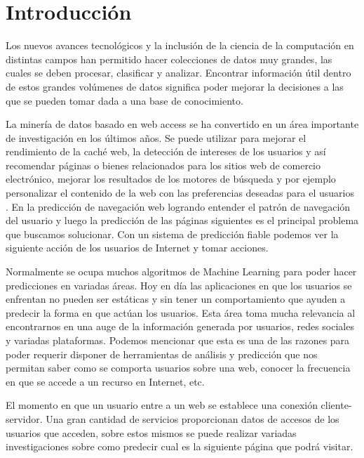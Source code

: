 \chapter[Introducción]{Introducción}
\label{ch:intro}

{

Los nuevos avances tecnológicos  y la inclusión de la ciencia de la computación en distintas campos han permitido hacer colecciones de datos muy grandes, las cuales se deben procesar, clasificar y analizar. Encontrar información útil dentro de estos grandes volúmenes de datos significa poder mejorar la decisiones a las que se pueden tomar dada a una base de conocimiento.

La minería de datos basado en web access se ha convertido en un área importante de investigación en los últimos años. Se puede utilizar para mejorar el rendimiento de la caché web, la detección de intereses de los usuarios y así recomendar páginas o bienes relacionados para los sitios web de comercio electrónico, mejorar los resultados de los motores de búsqueda  y por ejemplo personalizar el contenido de la web con las preferencias deseadas para el usuarios . En la predicción de navegación web logrando entender el patrón de navegación del usuario y luego la predicción de las páginas siguientes es el principal problema que buscamos solucionar. Con un sistema de predicción fiable podemos ver la siguiente acción de los usuarios de Internet y tomar acciones.

Normalmente se ocupa muchos algoritmos de Machine Learning para poder hacer predicciones en variadas áreas.  Hoy en día las aplicaciones en que los usuarios se enfrentan no pueden ser estáticas y sin tener un comportamiento que ayuden a predecir la forma en que actúan los usuarios. Esta área toma mucha relevancia al encontrarnos en una auge de la información generada por usuarios, redes sociales y variadas plataformas. Podemos mencionar que esta es una de las razones para poder requerir disponer de herramientas de análisis y predicción que nos permitan saber como se comporta usuarios sobre una web, conocer la frecuencia en que se accede a un recurso en Internet, etc.

El momento en que un usuario entre a un web se establece una conexión cliente-servidor. Una gran cantidad de servicios proporcionan datos de accesos de los usuarios que acceden, sobre estos mismos se puede realizar variadas investigaciones sobre como predecir cual es la siguiente página que podrá visitar.

}
